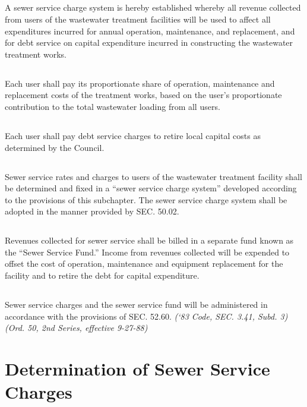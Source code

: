 \documentclass[code.tex]{subfiles}
\begin{document}
\subsection{}
A sewer service charge system is hereby established whereby all revenue collected from users of the wastewater treatment facilities will be used to affect all expenditures incurred for annual operation, maintenance, and replacement, and for debt service on capital expenditure incurred in constructing the wastewater treatment works.
\subsection{}
Each user shall pay its proportionate share of operation, maintenance and replacement costs of the treatment works, based on the user’s proportionate contribution to the total wastewater loading from all users.
\subsection{}
Each user shall pay debt service charges to retire local capital costs as determined by the Council.
\subsection{}
Sewer service rates and charges to users of the wastewater treatment facility shall be determined and fixed in a “sewer service charge system” developed according to the provisions of this subchapter. The sewer service charge system shall be adopted in the manner provided by SEC. 50.02.
\subsection{}
Revenues collected for sewer service shall be billed in a separate fund known as the “Sewer Service Fund.” Income from revenues collected will be expended to offset the cost of operation, maintenance and equipment replacement for the facility and to retire the debt for capital expenditure.
\subsection{}
Sewer service charges and the sewer service fund will be administered in accordance with the provisions of SEC. 52.60.\newline
\emph{(‘83 Code, SEC. 3.41, Subd. 3) (Ord. 50, 2nd Series, effective 9-27-88)}
\section{Determination of Sewer Service Charges}
\end{document}
